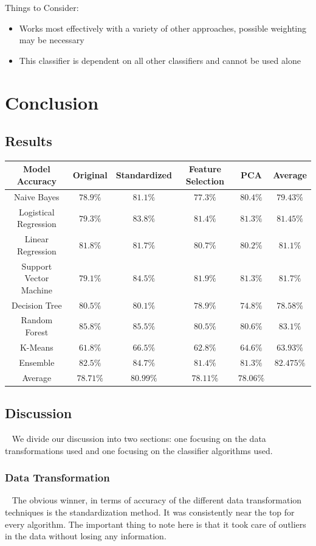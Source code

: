 \documentclass{article}
\begin{document}
		Things to Consider:
		\begin{itemize}
			\item Works most effectively with a variety of other approaches, possible weighting may be necessary 
			\item This classifier is dependent on all other classifiers and cannot be used alone
		\end{itemize}
		
	\section{Conclusion}


	\subsection{Results}
	
	\begin{tabular}{c|cccc|c}
		Model Accuracy & Original & Standardized & Feature Selection & PCA & Average\\
		\hline
		Naive Bayes & $78.9\%$&$81.1\%$ &$77.3\%$ &$80.4\%$ &$79.43\%$\\
		Logistical Regression & $79.3\%$& $83.8\%$ &$81.4\%$ &$81.3\%$&$81.45\%$\\
		Linear Regression &$81.8\%$ &$81.7\%$ &$80.7\%$ &$80.2\%$&$81.1\%$\\
		Support Vector Machine &$79.1\%$ &$84.5\%$ & $81.9\%$ &$81.3\%$&$81.7\%$\\
		Decision Tree & $80.5\%$ & $80.1\%$&$78.9\%$ &$74.8\%$&$78.58\%$\\
		Random Forest &$85.8\%$ & $85.5\%$&$80.5\%$ &$80.6\%$&$83.1\%$\\
		K-Means &$61.8\%$ & $66.5\%$&$62.8\%$ &$64.6\%$&$63.93\%$\\
		Ensemble &$82.5\%$ & $84.7\%$&$81.4\%$ &$81.3\%$&$82.475\%$\\
		\hline
		Average &$78.71\%$ & $80.99\%$&$78.11\%$ &$78.06\%$&\\
		 
	\end{tabular}
	
	\subsection{Discussion}~
	We divide our discussion into two sections: one focusing on the data transformations used and one focusing on the classifier algorithms used.
	\subsubsection{Data Transformation}~
	The obvious winner, in terms of accuracy of the different data transformation techniques is the standardization method. It was consistently near the top for every algorithm. The important thing to note here is that it took care of outliers in the data without losing any information.\\
	
\end{document}
